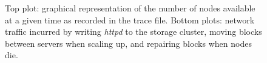 \begin{figure}[ht]
    \centering
    
    \caption{Top plot: graphical representation of the number of nodes available at a given time as recorded in the trace file. Bottom plots: network traffic incurred by writing \textit{httpd} to the storage cluster, moving blocks between servers when scaling up, and repairing blocks when nodes die.}
    \label{fig:trace-plot}
\end{figure}
